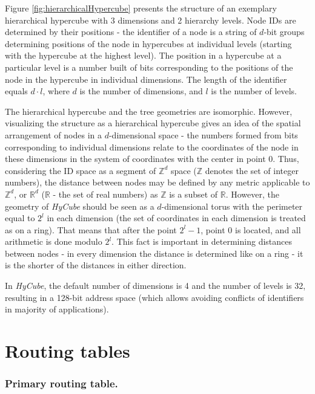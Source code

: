 Figure \ref{fig:hierarchicalHypercube} presents the structure of an exemplary hierarchical hypercube with 3 dimensions and 2 hierarchy levels. Node IDs are determined by their positions - the identifier of a node is a string of $d$-bit groups determining positions of the node in hypercubes at individual levels (starting with the hypercube at the highest level). The position in a hypercube at a particular level is a number built of bits corresponding to the positions of the node in the hypercube in individual dimensions. The length of the identifier equals $d \cdot l$, where $d$ is the number of dimensions, and $l$ is the number of levels.

The hierarchical hypercube and the tree geometries are isomorphic. However, visualizing the structure as a hierarchical hypercube gives an idea of the spatial arrangement of nodes in a $d$-dimensional space - the numbers formed from bits corresponding to individual dimensions relate to the coordinates of the node in these dimensions in the system of coordinates with the center in point $0$. Thus, considering the ID space as a segment of $\mathbb{Z}^d$ space ($\mathbb{Z}$ denotes the set of integer numbers), the distance between nodes may be defined by any metric applicable to $\mathbb{Z}^d$, or $\mathbb{R}^d$ ($\mathbb{R}$ - the set of real numbers) as $\mathbb{Z}$ is a subset of $\mathbb{R}$. However, the geometry of \emph{HyCube} should be seen as a $d$-dimensional torus with the perimeter equal to $2^l$ in each dimension (the set of coordinates in each dimension is treated as on a ring). That means that after the point $2^l-1$, point $0$ is located, and all arithmetic is done modulo $2^l$. This fact is important in determining distances between nodes - in every dimension the distance is determined like on a ring - it is the shorter of the distances in either direction.

In \emph{HyCube}, the default number of dimensions is 4 and the number of levels is 32, resulting in a 128-bit address space (which allows avoiding conflicts of identifiers in majority of applications).



\section{Routing tables}
\label{sec:hycubeRoutingTables}

\subsubsection{Primary routing table.}

